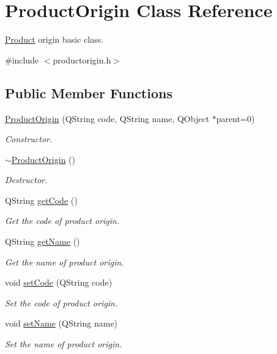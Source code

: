 \hypertarget{class_product_origin}{\section{\-Product\-Origin \-Class \-Reference}
\label{class_product_origin}
}


\hyperlink{class_product}{\-Product} origin basic class.  




{\ttfamily \#include $<$productorigin.\-h$>$}

\subsection*{\-Public \-Member \-Functions}
\begin{DoxyCompactItemize}
\item 
\hyperlink{class_product_origin_a4989e11dc0ed401f6a4799c751448f36}{\-Product\-Origin} (\-Q\-String code, \-Q\-String name, \-Q\-Object $\ast$parent=0)
\begin{DoxyCompactList}\small\item\em \-Constructor. \end{DoxyCompactList}\item 
\hyperlink{class_product_origin_a9a5c71965dc91d2d13b3c727749034e1}{$\sim$\-Product\-Origin} ()
\begin{DoxyCompactList}\small\item\em \-Destructor. \end{DoxyCompactList}\item 
\-Q\-String \hyperlink{class_product_origin_afd1402a26411513a1b327251b66d4c32}{get\-Code} ()
\begin{DoxyCompactList}\small\item\em \-Get the code of product origin. \end{DoxyCompactList}\item 
\-Q\-String \hyperlink{class_product_origin_a26e9b4245f4225b62e686d9af4175d1f}{get\-Name} ()
\begin{DoxyCompactList}\small\item\em \-Get the name of product origin. \end{DoxyCompactList}\item 
void \hyperlink{class_product_origin_a86532bfba04d809d7f135eac7a9320b3}{set\-Code} (\-Q\-String code)
\begin{DoxyCompactList}\small\item\em \-Set the code of product origin. \end{DoxyCompactList}\item 
void \hyperlink{class_product_origin_ac575fb48c67cd248aeec7d6d5f82387b}{set\-Name} (\-Q\-String name)
\begin{DoxyCompactList}\small\item\em \-Set the name of product origin. \end{DoxyCompactList}\end{DoxyCompactItemize}


